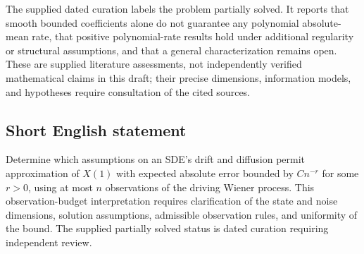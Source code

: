 \documentclass[11pt]{article}
\begin{document}
The supplied dated curation labels the problem partially solved. It reports that smooth bounded coefficients alone do not guarantee any polynomial absolute-mean rate, that positive polynomial-rate results hold under additional regularity or structural assumptions, and that a general characterization remains open. These are supplied literature assessments, not independently verified mathematical claims in this draft; their precise dimensions, information models, and hypotheses require consultation of the cited sources.
\subsection{Short English statement}
Determine which assumptions on an SDE's drift and diffusion permit approximation of $X(1)$ with expected absolute error bounded by $C n^{-r}$ for some $r>0$, using at most $n$ observations of the driving Wiener process. This observation-budget interpretation requires clarification of the state and noise dimensions, solution assumptions, admissible observation rules, and uniformity of the bound. The supplied partially solved status is dated curation requiring independent review.
\end{document}

